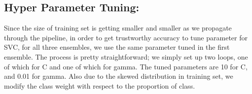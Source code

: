 \subsection{Hyper Parameter Tuning:}
Since the size of training set is getting smaller and smaller as we propagate through the pipeline, in order to get trustworthy accuracy to tune parameter for SVC, for all three ensembles, we use the same parameter tuned in the first ensemble. The process is pretty straightforward; we simply set up two loops, one of which for C and one of which for gamma. The tuned parameters are 10 for C, and 0.01 for gamma. Also due to the skewed distribution in training set, we modify the class weight with respect to the proportion of class. 


